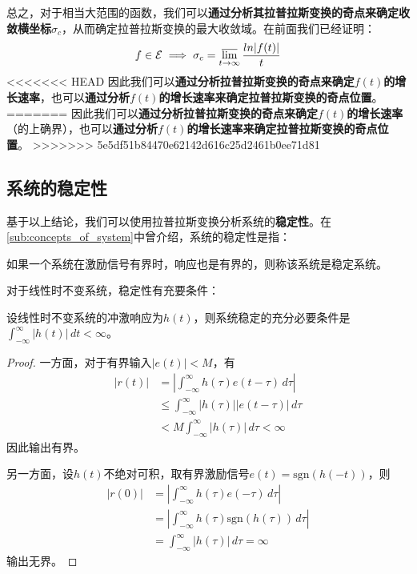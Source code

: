 总之，对于相当大范围的函数，我们可以\textbf{通过分析其拉普拉斯变换的奇点来确定收敛横坐标}$\sigma_c$，从而确定拉普拉斯变换的最大收敛域。在前面我们已经证明：$$f\in\mathcal{E}\implies \sigma_c=\varlimsup_{t\to\infty}\frac{ln|f(t)|}{t}$$
<<<<<<< HEAD
因此我们可以\textbf{通过分析拉普拉斯变换的奇点来确定$f(t)$的增长速率}，也可以\textbf{通过分析$f(t)$的增长速率来确定拉普拉斯变换的奇点位置}。
=======
因此我们可以\textbf{通过分析拉普拉斯变换的奇点来确定$f(t)$的增长速率}（的上确界），也可以\textbf{通过分析$f(t)$的增长速率来确定拉普拉斯变换的奇点位置}。
>>>>>>> 5e5df51b84470e62142d616c25d2461b0ee71d81

\subsection{系统的稳定性}\label{sub:stability_of_system}
基于以上结论，我们可以使用拉普拉斯变换分析系统的\textbf{稳定性}。在\ref{sub:concepts_of_system}中曾介绍，系统的稳定性是指：
\begin{definition}
    如果一个系统在激励信号有界时，响应也是有界的，则称该系统是稳定系统。
\end{definition}

对于线性时不变系统，稳定性有充要条件：
\begin{proposition}[稳定性的时域判则]
    设线性时不变系统的冲激响应为$h(t)$，则系统稳定的充分必要条件是$\int_{-\infty}^{\infty}|h(t)|\,dt<\infty$。
\end{proposition}
\begin{proof}
    一方面，对于有界输入$|e(t)|<M$，有
    \begin{align*}
        |r(t)|&=\left|\int_{-\infty}^{\infty}h(\tau)e(t-\tau)\,d\tau\right|\\
        &\leq \int_{-\infty}^{\infty}|h(\tau)||e(t-\tau)|\,d\tau\\
        &<M\int_{-\infty}^{\infty}|h(\tau)|\,d\tau<\infty
    \end{align*}
    因此输出有界。

    另一方面，设$h(t)$不绝对可积，取有界激励信号$e(t)=\text{sgn}(h(-t))$，则
    \begin{align*}
        |r(0)|&=\left|\int_{-\infty}^{\infty}h(\tau)e(-\tau)\,d\tau\right|\\
        &=\left|\int_{-\infty}^{\infty}h(\tau)\text{sgn}(h(\tau))\,d\tau\right|\\
        &=\int_{-\infty}^{\infty}|h(\tau)|\,d\tau=\infty
    \end{align*}
    输出无界。
\end{proof}

